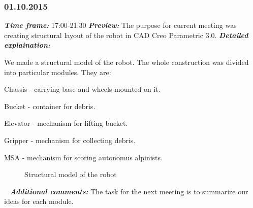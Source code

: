 \subsubsection{01.10.2015}
	\textit{\textbf{Time frame:}} 17:00-21:30 \newline
	\textit{\textbf{Preview:}} The purpose for current meeting was creating structural layout of the robot in CAD Creo Parametric 3.0.\newline \newline
  \textit{\textbf{Detailed explaination:}}
  \begin{enumerate*}
  	\item We made a structural model of the robot. The whole construction was divided into particular modules. They are:
  	\begin{enumerate*}
  		\item Chassis - carrying base and wheels mounted on it.
  		
  		\item Bucket - container for debris.
  		
  		\item Elevator - mechanism for lifting bucket.
  		
  		\item Gripper - mechanism for collecting debris.
  		
  		\item MSA - mechanism for scoring autonomus alpinists.
  	\end{enumerate*}
  	\begin{figure}[H]
  		\begin{minipage}[h]{1\linewidth}
  			\caption{Structural model of the robot}
  		\end{minipage}
  	\end{figure}
  	
  \end{enumerate*}
  
   \newline
  \textit{\textbf{Additional comments:}} The task for the next meeting is to summarize our ideas for each module.

\fillpage
